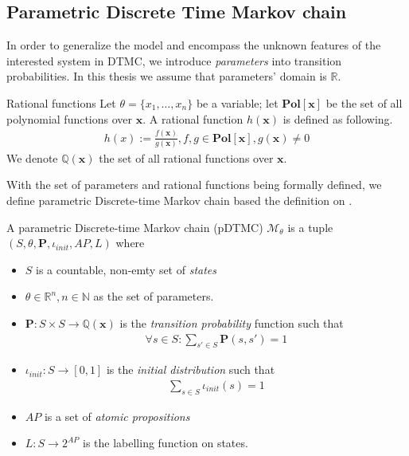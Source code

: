 \subsection{Parametric Discrete Time Markov chain}
In order to generalize the model and encompass the unknown features of the interested system in
DTMC, we introduce \textit{parameters} into transition probabilities. In this thesis we assume that
parameters' domain is $\mathbb{R}$.
\begin{definition}{Rational functions}
    Let $\theta=\{x_1,\ldots,x_n\}$ be a variable; let $\mathbf{Pol}[\mathbf{x}]$ be the set of
    all polynomial functions over $\mathbf{x}$. A rational function $h(\mathbf{x})$ is defined
    as following.
    \begin{align*}
        h(x) := \frac{f(\mathbf{x})}{g(\mathbf{x})}, f,g\in\mathbf{Pol}[\mathbf{x}], g(\mathbf{x}) \neq 0
    \end{align*}
    We denote $\mathbb{Q}(\mathbf{x})$ the set of all rational functions over $\mathbf{x}$.
\end{definition}
With the set of parameters and rational functions being formally defined, we define parametric
Discrete-time Markov chain based the definition on \cite{junges2019parameter}.
\begin{definition}
    A parametric Discrete-time Markov chain (pDTMC) $\mathcal{M}_\theta$ is a tuple $(S, \theta,
        \mathbf{P}, \iota_{init}, AP, L)$ where
    \begin{itemize}
        \item $S$ is a countable, non-emty set of \textit{states}
        \item $\theta \in \mathbb{R}^n, n \in \mathbb{N}$ as the set of  parameters.
        \item $\mathbf{P}:S\times S \rightarrow \mathbb{Q}(\mathbf{x})$ is the \textit{transition
                  probability} function such that
              \begin{align*}
                  \forall s \in S : \sum_{s'\in S}\mathbf{P}(s, s') = 1
              \end{align*}
        \item $\iota_{init}: S \rightarrow [0,1]$ is the \textit{initial distribution} such that
              \begin{align*}
                  \sum_{s\in S}\iota_{init}(s) = 1
              \end{align*}
        \item $AP$ is a set of \textit{atomic propositions}
        \item $L: S \rightarrow 2^{AP}$ is the labelling function on states.
    \end{itemize}
\end{definition}
